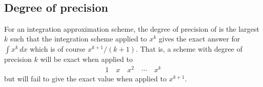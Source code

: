 \noindent {} \\

\subsection{Degree of precision}

For an integration approximation scheme, the degree of precision of is the largest $k$ such that the integration scheme applied to $x^k$ gives the exact answer for $\int x^k \, dx$ which is of course $x^{k+1}/(k+1)$. That is, a scheme with degree of precision $k$ will be exact when applied to
\begin{align*}
1 \quad x \quad x^2 \quad \cdots \quad x^k
\end{align*}
but will fail to give the exact value when applied to $x^{k+1}$.

